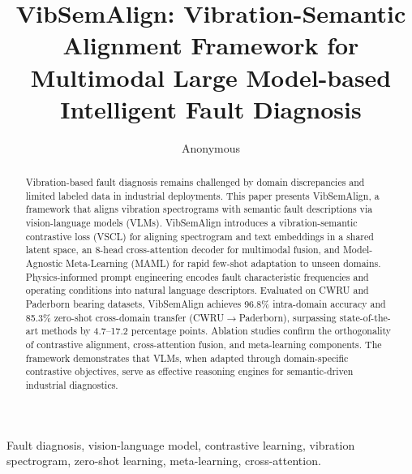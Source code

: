 \documentclass[lettersize,journal]{IEEEtran}
\begin{document}
\title{VibSemAlign: Vibration-Semantic Alignment Framework for Multimodal Large Model-based Intelligent Fault Diagnosis}

\author{Anonymous}

\maketitle

\begin{abstract}
Vibration-based fault diagnosis remains challenged by domain discrepancies and limited labeled data in industrial deployments. This paper presents VibSemAlign, a framework that aligns vibration spectrograms with semantic fault descriptions via vision-language models (VLMs). VibSemAlign introduces a vibration-semantic contrastive loss (VSCL) for aligning spectrogram and text embeddings in a shared latent space, an 8-head cross-attention decoder for multimodal fusion, and Model-Agnostic Meta-Learning (MAML) for rapid few-shot adaptation to unseen domains. Physics-informed prompt engineering encodes fault characteristic frequencies and operating conditions into natural language descriptors. Evaluated on CWRU and Paderborn bearing datasets, VibSemAlign achieves 96.8\% intra-domain accuracy and 85.3\% zero-shot cross-domain transfer (CWRU$\to$Paderborn), surpassing state-of-the-art methods by 4.7--17.2 percentage points. Ablation studies confirm the orthogonality of contrastive alignment, cross-attention fusion, and meta-learning components. The framework demonstrates that VLMs, when adapted through domain-specific contrastive objectives, serve as effective reasoning engines for semantic-driven industrial diagnostics.
\end{abstract}

\begin{IEEEkeywords}
Fault diagnosis, vision-language model, contrastive learning, vibration spectrogram, zero-shot learning, meta-learning, cross-attention.
\end{IEEEkeywords}









\end{document}
